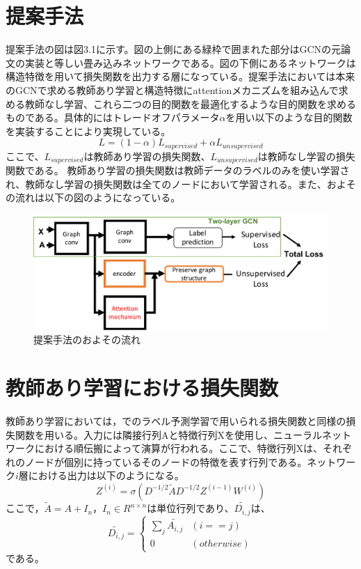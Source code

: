 \section{提案手法}
提案手法の図は図3.1に示す。図の上側にある緑枠で囲まれた部分はGCNの元論文の実装と等しい畳み込みネットワークである。図の下側にあるネットワークは構造特徴を用いて損失関数を出力する層になっている。提案手法においては本来のGCNで求める教師あり学習と構造特徴にattentionメカニズムを組み込んで求める教師なし学習、これら二つの目的関数を最適化するような目的関数を求めるものである。具体的にはトレードオフパラメータ$\alpha $を用い以下のような目的関数を実装することにより実現している。
\begin{equation}
L = (1-\alpha) L_{supervised} + \alpha L_{unsupervised}
\end{equation}
ここで、$L_{supervised}$は教師あり学習の損失関数、$L_{unsupervised}$は教師なし学習の損失関数である。
教師あり学習の損失関数は教師データのラベルのみを使い学習され、教師なし学習の損失関数は全てのノードにおいて学習される。また、およその流れは以下の図のようになっている。
\begin{figure}[htbp]
\includegraphics[width=1.0\hsize]{figures/proposed.pdf}
\caption{提案手法のおよその流れ}
\label{fig:flow}
\end{figure}
\section{教師あり学習における損失関数}
教師あり学習においては，\cite{gcn}でのラベル予測学習で用いられる損失関数と同様の損失関数を用いる。入力には隣接行列Aと特徴行列Xを使用し、ニューラルネットワークにおける順伝搬によって演算が行われる。ここで、特徴行列Xは、それぞれのノードが個別に持っているそのノードの特徴を表す行列である。ネットワーク$i$層における出力は以下のようになる。
\begin{equation}
Z^{(i)} = \sigma(D^{-1/2}\tilde{A}D^{-1/2}Z^{(i-1)}W^{(i)})
\end{equation}
ここで，$\tilde{A}=A+I_{n}$，$I_{n}\in R^{n \times n}$は単位行列であり、$\tilde{D_{i,j}}$は、
\begin{equation}
\tilde{D_{i,j}} = \begin{cases}
    \sum_j \tilde{A_{i,j}} & (i==j) \\
    0 & (otherwise)
  \end{cases}
\end{equation}
である。\\


